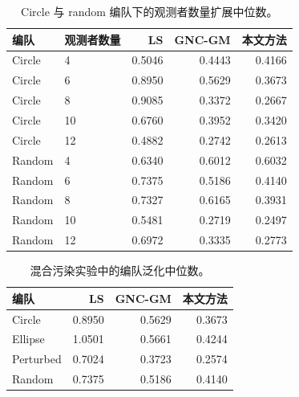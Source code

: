 \begin{table}[H]
\centering
\caption{Circle 与 random 编队下的观测者数量扩展中位数。}
\label{tab:scalingextra}
\small
\begin{tabular}{llrrr}
\toprule
编队 & 观测者数量 & LS & GNC-GM & 本文方法 \\
\midrule
Circle & 4 & 0.5046 & 0.4443 & 0.4166 \\
Circle & 6 & 0.8950 & 0.5629 & 0.3673 \\
Circle & 8 & 0.9085 & 0.3372 & 0.2667 \\
Circle & 10 & 0.6760 & 0.3952 & 0.3420 \\
Circle & 12 & 0.4882 & 0.2742 & 0.2613 \\
\midrule
Random & 4 & 0.6340 & 0.6012 & 0.6032 \\
Random & 6 & 0.7375 & 0.5186 & 0.4140 \\
Random & 8 & 0.7327 & 0.6165 & 0.3931 \\
Random & 10 & 0.5481 & 0.2719 & 0.2497 \\
Random & 12 & 0.6972 & 0.3335 & 0.2773 \\
\bottomrule
\end{tabular}
\end{table}

\begin{table}[H]
\centering
\caption{混合污染实验中的编队泛化中位数。}
\label{tab:formationextra}
\begin{tabular}{lrrr}
\toprule
编队 & LS & GNC-GM & 本文方法 \\
\midrule
Circle & 0.8950 & 0.5629 & 0.3673 \\
Ellipse & 1.0501 & 0.5661 & 0.4244 \\
Perturbed & 0.7024 & 0.3723 & 0.2574 \\
Random & 0.7375 & 0.5186 & 0.4140 \\
\bottomrule
\end{tabular}
\end{table}

